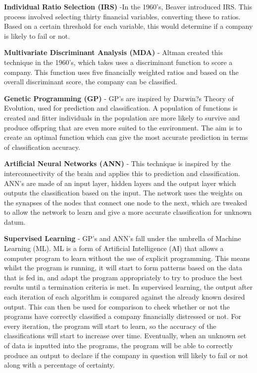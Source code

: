 \documentclass[11pt]{article}
\begin{document}
\textbf{Individual Ratio Selection (IRS)} -In the 1960's, Beaver introduced IRS. This process involved selecting thirty financial variables, converting these to ratios. Based on a certain threshold for each variable, this would determine if a company is likely to fail or not.

\textbf{Multivariate Discriminant Analysis (MDA)} - Altman created this technique in the 1960's, which takes uses a discriminant function to score a company. This function uses five financially weighted ratios and based on the overall discriminant score, the company can be classified. 

\textbf{Genetic Programming (GP)} - GP's are inspired by Darwin?s Theory of Evolution, used for prediction and classification. A population of functions is created and fitter individuals in the population are more likely to survive and produce offspring that are even more suited to the environment. The aim is to create an optimal function which can give the most accurate prediction in terms of classification accuracy. 

\textbf{Artificial Neural Networks (ANN)} - This technique is inspired by the interconnectivity of the brain and applies this to prediction and classification. ANN's are made of an input layer, hidden layers and the output layer which outputs the classification based on the input. The network uses the weights on the synapses of the nodes that connect one node to the next, which are tweaked to allow the network to learn and give a more accurate classification for unknown datum. 

\textbf{Supervised Learning} - GP's and ANN's fall under the umbrella of Machine Learning (ML). ML is a form of Artificial Intelligence (AI) that allows a computer program to learn without the use of explicit programming. This means whilst the program is running, it will start to form patterns based on the data that is fed in, and adapt the program appropriately to try to produce the best results until a termination criteria is met.
In supervised learning, the output after each iteration of each algorithm is compared against the already known desired output. This can then be used for comparison to check whether or not the programs have correctly classified a company financially distressed or not. For every iteration, the program will start to learn, so the accuracy of the classifications will start to increase over time. Eventually, when an unknown set of data is inputted into the programs, the program will be able to correctly produce an output to declare if the company in question will likely to fail or not along with a percentage of certainty.\\ 
\end{document}

